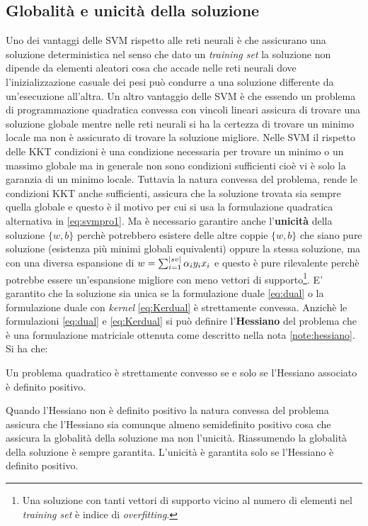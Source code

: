 \subsection{Globalità e unicità della soluzione}
\label{sub:globuni}
Uno dei vantaggi delle \ac{SVM} rispetto alle reti neurali è che assicurano una soluzione deterministica nel senso che dato un \textit{training set} la soluzione non dipende da elementi aleatori cosa che accade nelle reti neurali dove l'inizializzazione casuale dei pesi può condurre a una soluzione differente da un'esecuzione all'altra. Un altro vantaggio delle \ac{SVM} è che essendo un problema di programmazione quadratica convessa con vincoli lineari assicura di trovare una soluzione globale mentre nelle reti neurali si ha la certezza di trovare un minimo locale ma non è assicurato di trovare la soluzione migliore. Nelle \ac{SVM} il rispetto delle  KKT condizioni è una condizione necessaria per trovare un minimo o un massimo globale ma in generale non sono condizioni sufficienti cioè vi è solo la garanzia di un minimo locale. Tuttavia la natura convessa del problema, rende le condizioni KKT anche sufficienti, assicura che la soluzione trovata sia sempre quella globale e questo è il motivo per cui si usa la formulazione quadratica alternativa in \ref{eq:svmpro1}. Ma è necessario garantire anche l'\textbf{unicità} della soluzione $\{w,b\}$ perchè potrebbero esistere delle altre coppie $\{w,b\}$ che siano pure soluzione (esistenza più minimi globali equivalenti) oppure la stessa soluzione, ma con una diversa espansione di $w=\sum_{i=1}^{\lvert sv\rvert}\alpha_iy_ix_i$ e questo è pure rilevalente perchè potrebbe essere un'espansione migliore con meno vettori di supporto\footnote{Una soluzione con tanti vettori di supporto vicino al numero di elementi nel \textit{training set} è indice di \textit{overfitting}.}.
E' garantito che la soluzione sia unica se la formulazione duale \ref{eq:dual} o la formulazione duale con \textit{kernel} \ref{eq:Kerdual} è strettamente convessa. Anzichè le formulazioni \ref{eq:dual} e \ref{eq:Kerdual} si può definire l'\textbf{Hessiano} del problema che è una formulazione matriciale ottenuta come descritto nella nota \ref{note:hessiano}. Si ha che:
\begin{teorema*} Un problema quadratico è strettamente convesso se e solo se l'Hessiano associato è definito positivo.
\end{teorema*}
Quando l'Hessiano non è definito positivo la natura convessa del problema assicura che l'Hessiano sia comunque  almeno semidefinito positivo cosa che assicura la globalità della soluzione ma non l'unicità.  Riassumendo la globalità della soluzione è sempre garantita. L'unicità è garantita solo se l'Hessiano è definito positivo. 

